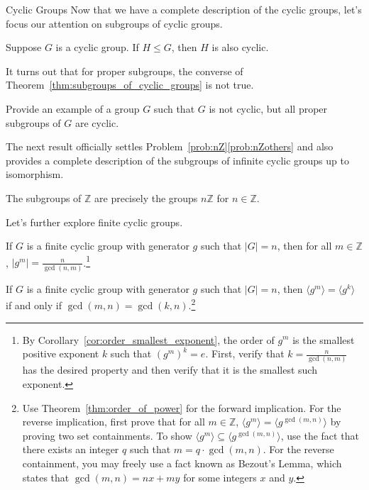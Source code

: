 \begin{section}{Cyclic Groups}
Now that we have a complete description of the cyclic groups, let's focus our attention on subgroups of cyclic groups.  

\begin{theorem}\label{thm:subgroups_of_cyclic_groups}
Suppose $G$ is a cyclic group. If $H\leq G$, then $H$ is also cyclic.
\end{theorem}

It turns out that for proper subgroups, the converse of Theorem~\ref{thm:subgroups_of_cyclic_groups} is not true.

\begin{problem}
Provide an example of a group $G$ such that $G$ is not cyclic, but all proper subgroups of $G$ are cyclic.
\end{problem}

The next result officially settles Problem~\ref{prob:nZ}\ref{prob:nZothers} and also provides a complete description of the subgroups of infinite cyclic groups up to isomorphism.

\begin{corollary}\label{cor:subgroups_of_Z}
The subgroups of $\mathbb{Z}$ are precisely the groups $n\mathbb{Z}$ for $n\in \mathbb{Z}$.
\end{corollary}

Let's further explore finite cyclic groups.

\begin{theorem}\label{thm:order_of_power}
If $G$ is a finite cyclic group with generator $g$ such that $|G|=n$, then for all $m\in\mathbb{Z}$, $\displaystyle |g^m|=\frac{n}{\gcd(n,m)}$.\footnote{By Corollary~\ref{cor:order_smallest_exponent}, the order of $g^m$ is the smallest positive exponent $k$ such that $(g^m)^k=e$. First, verify that $k=\frac{n}{\gcd(n,m)}$ has the desired property and then verify that it is the smallest such exponent.}
\end{theorem}

\begin{theorem}\label{thm:subgroups_gcd}
If $G$ is a finite cyclic group with generator $g$ such that $|G|=n$, then $\langle g^m\rangle=\langle g^k\rangle$ if and only if $\gcd(m,n)=\gcd(k,n)$.\footnote{Use Theorem~\ref{thm:order_of_power} for the forward implication. For the reverse implication, first prove that for all $m\in\mathbb{Z}$, $\langle g^m\rangle=\langle g^{\gcd(m,n)}\rangle$ by proving two set containments. To show $\langle g^m\rangle\subseteq \langle g^{\gcd(m,n)}\rangle$, use the fact that there exists an integer $q$ such that $m=q\cdot \gcd(m,n)$. For the reverse containment, you may freely use a fact known as Bezout's Lemma, which states that $\gcd(m,n)=nx+my$ for some integers $x$ and $y$.}
\end{theorem}


\end{section}
